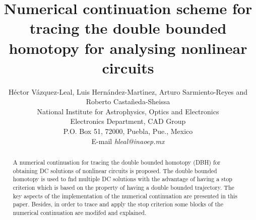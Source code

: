 \documentclass[conference]{IEEEtran}
\begin{document}
\title{Numerical continuation scheme for tracing the double bounded homotopy for analysing  nonlinear circuits}

\author{H\'ector V\'azquez-Leal, Luis Hern\'andez-Mart\'{\i}nez, Arturo
Sarmiento-Reyes and Roberto Casta\~neda-Sheissa \\ National Institute for Astrophysics, Optics and Electronics\\
Electronics Department, CAD Group\\ P.O. Box 51, 72000, Puebla, Pue., Mexico \\ E-mail {\it  hleal@inaoep.mx}}




% 




\maketitle



\begin{abstract}
A numerical continuation for tracing the double bounded homotopy (DBH) for
obtaining  DC solutions of 
nonlinear circuits is proposed.
The double bounded homotopy is used  to fnd multiple DC solutions 
with the advantage of having
a stop criterion  which is based on the property of having a double bounded trajectory. 
The key aspects of the implementation of the numerical continuation are presented in this paper. Besides, in order to
trace and apply the stop criterion some blocks of the numerical continuation are modifed and explained.
\end{abstract}
\end{document}
